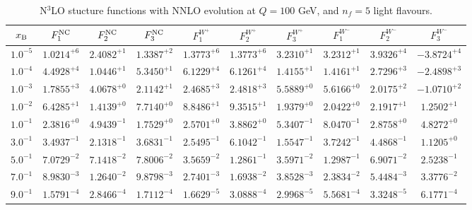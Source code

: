 \begin{table}[h]
\begin{adjustbox}{width=\textwidth}
\begin{tabular}{|c||c|c|c|c|c|c|c|c|c|}
\hline
$x_{\rm B}$ & $F_1^{\rm NC}$ & $F_2^{\rm NC}$ & $F_3^{\rm NC}$ & $F_1^{W^+}$ & $F_2^{W^+}$ & $F_3^{W^+}$ & $F_1^{W^-}$ & $F_2^{W^-}$ & $F_3^{W^-}$ \\
\hline
$ 1.0^{-5}$ & $ 1.0214^{+6}$ & $ 2.4082^{+1}$ & $ 1.3387^{+2}$ & $ 1.3773^{+6}$ & $ 1.3773^{+6}$ & $ 3.2310^{+1}$ & $ 3.2312^{+1}$ & $ 3.9326^{+4}$ & $-3.8724^{+4}$ \\
$ 1.0^{-4}$ & $ 4.4928^{+4}$ & $ 1.0446^{+1}$ & $ 5.3450^{+1}$ & $ 6.1229^{+4}$ & $ 6.1261^{+4}$ & $ 1.4155^{+1}$ & $ 1.4161^{+1}$ & $ 2.7296^{+3}$ & $-2.4898^{+3}$ \\
$ 1.0^{-3}$ & $ 1.7855^{+3}$ & $ 4.0678^{+0}$ & $ 2.1142^{+1}$ & $ 2.4685^{+3}$ & $ 2.4818^{+3}$ & $ 5.5889^{+0}$ & $ 5.6166^{+0}$ & $ 2.0175^{+2}$ & $-1.0710^{+2}$ \\
$ 1.0^{-2}$ & $ 6.4285^{+1}$ & $ 1.4139^{+0}$ & $ 7.7140^{+0}$ & $ 8.8486^{+1}$ & $ 9.3515^{+1}$ & $ 1.9379^{+0}$ & $ 2.0422^{+0}$ & $ 2.1917^{+1}$ & $ 1.2502^{+1}$ \\
$ 1.0^{-1}$ & $ 2.3816^{+0}$ & $ 4.9439^{-1}$ & $ 1.7529^{+0}$ & $ 2.5701^{+0}$ & $ 3.8862^{+0}$ & $ 5.3407^{-1}$ & $ 8.0470^{-1}$ & $ 2.8758^{+0}$ & $ 4.8272^{+0}$ \\
$ 3.0^{-1}$ & $ 3.4937^{-1}$ & $ 2.1318^{-1}$ & $ 3.6831^{-1}$ & $ 2.5495^{-1}$ & $ 6.1042^{-1}$ & $ 1.5547^{-1}$ & $ 3.7242^{-1}$ & $ 4.4868^{-1}$ & $ 1.1205^{+0}$ \\
$ 5.0^{-1}$ & $ 7.0729^{-2}$ & $ 7.1418^{-2}$ & $ 7.8006^{-2}$ & $ 3.5659^{-2}$ & $ 1.2861^{-1}$ & $ 3.5971^{-2}$ & $ 1.2987^{-1}$ & $ 6.9071^{-2}$ & $ 2.5238^{-1}$ \\
$ 7.0^{-1}$ & $ 8.9830^{-3}$ & $ 1.2640^{-2}$ & $ 9.8798^{-3}$ & $ 2.7401^{-3}$ & $ 1.6938^{-2}$ & $ 3.8528^{-3}$ & $ 2.3834^{-2}$ & $ 5.4484^{-3}$ & $ 3.3776^{-2}$ \\
$ 9.0^{-1}$ & $ 1.5791^{-4}$ & $ 2.8466^{-4}$ & $ 1.7112^{-4}$ & $ 1.6629^{-5}$ & $ 3.0888^{-4}$ & $ 2.9968^{-5}$ & $ 5.5681^{-4}$ & $ 3.3248^{-5}$ & $ 6.1771^{-4}$ \\
\hline
\end{tabular}
\end{adjustbox}\caption{N$^{3}$LO stucture functions with NNLO evolution at $Q = 100$ GeV, and $n_f=5$ light flavours.}
\label{tab:N3LO-Q100}
\end{table}


